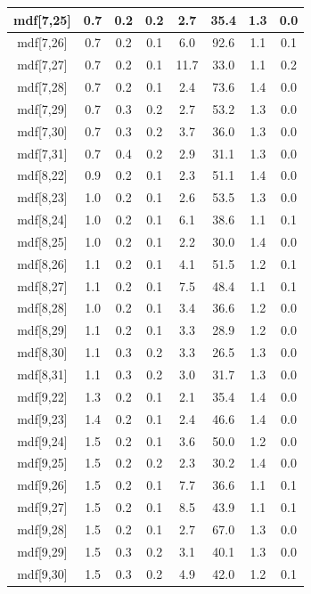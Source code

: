 \begin{longtable}{|c|c|c|c|c|c|c|c|}
\hline
mdf[7,25] & 0.7 & 0.2 & 0.2 & 2.7 & 35.4 & 1.3 & 0.0 \\
\hline
mdf[7,26] & 0.7 & 0.2 & 0.1 & 6.0 & 92.6 & 1.1 & 0.1 \\
\hline
mdf[7,27] & 0.7 & 0.2 & 0.1 & 11.7 & 33.0 & 1.1 & 0.2 \\
\hline
mdf[7,28] & 0.7 & 0.2 & 0.1 & 2.4 & 73.6 & 1.4 & 0.0 \\
\hline
mdf[7,29] & 0.7 & 0.3 & 0.2 & 2.7 & 53.2 & 1.3 & 0.0 \\
\hline
mdf[7,30] & 0.7 & 0.3 & 0.2 & 3.7 & 36.0 & 1.3 & 0.0 \\
\hline
mdf[7,31] & 0.7 & 0.4 & 0.2 & 2.9 & 31.1 & 1.3 & 0.0 \\
\hline
mdf[8,22] & 0.9 & 0.2 & 0.1 & 2.3 & 51.1 & 1.4 & 0.0 \\
\hline
mdf[8,23] & 1.0 & 0.2 & 0.1 & 2.6 & 53.5 & 1.3 & 0.0 \\
\hline
mdf[8,24] & 1.0 & 0.2 & 0.1 & 6.1 & 38.6 & 1.1 & 0.1 \\
\hline
mdf[8,25] & 1.0 & 0.2 & 0.1 & 2.2 & 30.0 & 1.4 & 0.0 \\
\hline
mdf[8,26] & 1.1 & 0.2 & 0.1 & 4.1 & 51.5 & 1.2 & 0.1 \\
\hline
mdf[8,27] & 1.1 & 0.2 & 0.1 & 7.5 & 48.4 & 1.1 & 0.1 \\
\hline
mdf[8,28] & 1.0 & 0.2 & 0.1 & 3.4 & 36.6 & 1.2 & 0.0 \\
\hline
mdf[8,29] & 1.1 & 0.2 & 0.1 & 3.3 & 28.9 & 1.2 & 0.0 \\
\hline
mdf[8,30] & 1.1 & 0.3 & 0.2 & 3.3 & 26.5 & 1.3 & 0.0 \\
\hline
mdf[8,31] & 1.1 & 0.3 & 0.2 & 3.0 & 31.7 & 1.3 & 0.0 \\
\hline
mdf[9,22] & 1.3 & 0.2 & 0.1 & 2.1 & 35.4 & 1.4 & 0.0 \\
\hline
mdf[9,23] & 1.4 & 0.2 & 0.1 & 2.4 & 46.6 & 1.4 & 0.0 \\
\hline
mdf[9,24] & 1.5 & 0.2 & 0.1 & 3.6 & 50.0 & 1.2 & 0.0 \\
\hline
mdf[9,25] & 1.5 & 0.2 & 0.2 & 2.3 & 30.2 & 1.4 & 0.0 \\
\hline
mdf[9,26] & 1.5 & 0.2 & 0.1 & 7.7 & 36.6 & 1.1 & 0.1 \\
\hline
mdf[9,27] & 1.5 & 0.2 & 0.1 & 8.5 & 43.9 & 1.1 & 0.1 \\
\hline
mdf[9,28] & 1.5 & 0.2 & 0.1 & 2.7 & 67.0 & 1.3 & 0.0 \\
\hline
mdf[9,29] & 1.5 & 0.3 & 0.2 & 3.1 & 40.1 & 1.3 & 0.0 \\
\hline
mdf[9,30] & 1.5 & 0.3 & 0.2 & 4.9 & 42.0 & 1.2 & 0.1 \\

\end{longtable}
